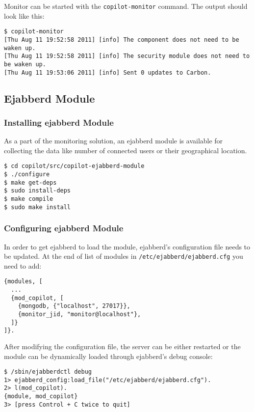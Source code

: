 Monitor can be started with the \texttt{copilot-monitor} command. The output should look like this:
\lstset{caption=Starting \copilot Monitor}
\begin{lstlisting}
$ copilot-monitor
[Thu Aug 11 19:52:58 2011] [info] The component does not need to be waken up.
[Thu Aug 11 19:52:58 2011] [info] The security module does not need to be waken up.
[Thu Aug 11 19:53:06 2011] [info] Sent 0 updates to Carbon.
\end{lstlisting}

\subsection{Ejabberd Module}

\subsubsection{Installing ejabberd Module}

As a part of the monitoring solution, an ejabberd module is available for collecting the data like number of connected users or their geographical location.
\lstset{caption=Installing ejabberd module}
\begin{lstlisting}
$ cd copilot/src/copilot-ejabberd-module
$ ./configure
$ make get-deps
$ sudo install-deps
$ make compile
$ sudo make install
\end{lstlisting}

\subsubsection{Configuring ejabberd Module}

In order to get ejabberd to load the module, ejabberd's configuration file needs to be updated. At the end of list of modules in \texttt{/etc/ejabberd/ejabberd.cfg} you need to add:
\lstset{caption=Updated ejabberd.cfg}
\begin{lstlisting}
{modules, [
  ...
  {mod_copilot, [
    {mongodb, {"localhost", 27017}},
    {monitor_jid, "monitor@localhost"},
  ]}
]}.
\end{lstlisting}

After modifying the configuration file, the server can be either restarted or the module can be dynamically loaded through ejabberd's debug console:

\lstset{caption=Loading mod\_copilot}
\begin{lstlisting}
$ /sbin/ejabberdctl debug
1> ejabberd_config:load_file("/etc/ejabberd/ejabberd.cfg").
2> l(mod_copilot).
{module, mod_copilot}
3> [press Control + C twice to quit]
\end{lstlisting}

